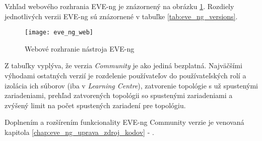 Vzhľad webového rozhrania EVE-ng je znázornený na obrázku \ref{obr:eve_ng_web}. Rozdiely jednotlivých verzii EVE-ng sú znázornené v tabuľke \ref{tab:eve_ng_versions}.

\begin{figure}
    \centering
    \texttt{[image: eve\_ng\_web]}
    \caption{Webové rozhranie nástroja EVE-ng}
    \label{obr:eve_ng_web}
\end{figure}

Z tabuľky vyplýva, že verzia \emph{Community} je ako jediná bezplatná. Najväčšími výhodami ostatných verzií je rozdelenie používateľov do používateľských rolí a izolácia ich súborov (iba v \emph{Learning Centre}), zatvorenie topológie s už spustenými zariadeniami, prehľad zatvorených topológii so spustenými zariadeniami a zvýšený limit na počet spustených zariadení pre topológiu.

Doplnením a rozšírením funkcionality EVE-ng Community verzie je venovaná kapitola \ref{chap:eve_ng_uprava_zdroj_kodov} - .

\newpage

